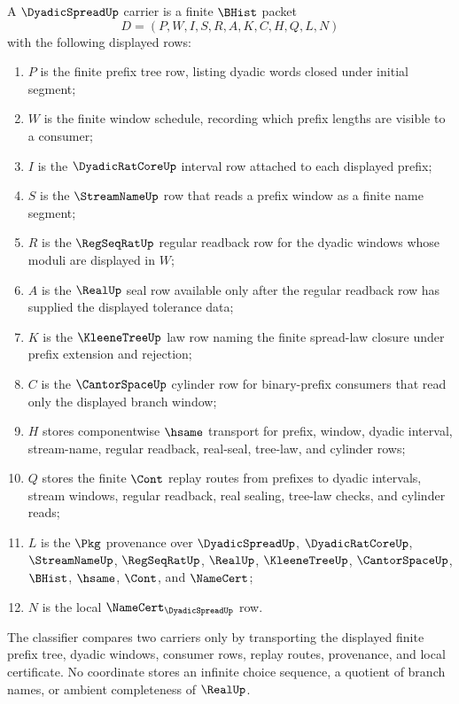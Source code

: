 \begin{definition}
\label{def:dyadic-spread-carrier}
A $\DyadicSpreadUp$ carrier is a finite $\BHist$ packet
$$
D=(P,W,I,S,R,A,K,C,H,Q,L,N)
$$
with the following displayed rows:
\begin{enumerate}
\item $P$ is the finite prefix tree row, listing dyadic words closed under initial segment;
\item $W$ is the finite window schedule, recording which prefix lengths are visible to a consumer;
\item $I$ is the $\DyadicRatCoreUp$ interval row attached to each displayed prefix;
\item $S$ is the $\StreamNameUp$ row that reads a prefix window as a finite name segment;
\item $R$ is the $\RegSeqRatUp$ regular readback row for the dyadic windows whose moduli are displayed in $W$;
\item $A$ is the $\RealUp$ seal row available only after the regular readback row has supplied the displayed tolerance data;
\item $K$ is the $\KleeneTreeUp$ law row naming the finite spread-law closure under prefix extension and rejection;
\item $C$ is the $\CantorSpaceUp$ cylinder row for binary-prefix consumers that read only the displayed branch window;
\item $H$ stores componentwise $\hsame$ transport for prefix, window, dyadic interval, stream-name, regular readback, real-seal, tree-law, and cylinder rows;
\item $Q$ stores the finite $\Cont$ replay routes from prefixes to dyadic intervals, stream windows, regular readback, real sealing, tree-law checks, and cylinder reads;
\item $L$ is the $\Pkg$ provenance over $\DyadicSpreadUp$, $\DyadicRatCoreUp$, $\StreamNameUp$, $\RegSeqRatUp$, $\RealUp$, $\KleeneTreeUp$, $\CantorSpaceUp$, $\BHist$, $\hsame$, $\Cont$, and $\NameCert$;
\item $N$ is the local $\NameCert_{\DyadicSpreadUp}$ row.
\end{enumerate}
The classifier compares two carriers only by transporting the displayed finite prefix tree, dyadic windows, consumer rows, replay routes, provenance, and local certificate. No coordinate stores an infinite choice sequence, a quotient of branch names, or ambient completeness of $\RealUp$.
\end{definition}

